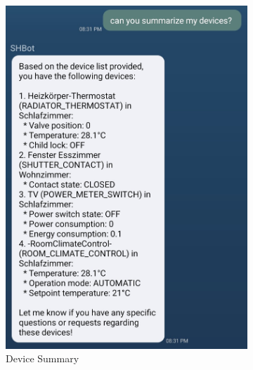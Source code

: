 \begin{figure}[htbp]
\begin{subfigure}{.44\textwidth}
        \includegraphics[width=\textwidth]{graphics/devicesummary.jpg}
        \caption{Device Summary}
        \label{fig:devicesummary}
    \end{subfigure}
    \vfill
    \begin{subfigure}{.48\textwidth}

\end{subfigure}
\end{figure}
